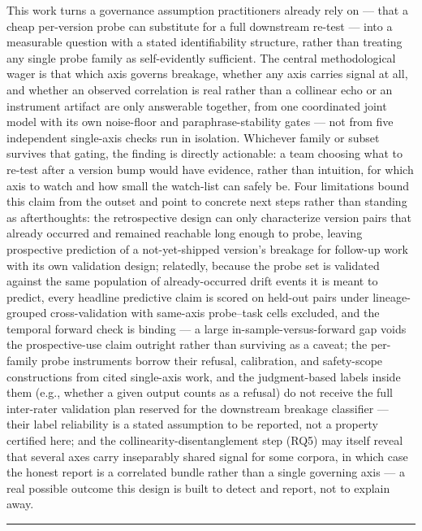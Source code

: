 \documentclass[11pt]{article}
\begin{document}
This work turns a governance assumption practitioners already rely on --- that a cheap per-version probe can substitute for a full downstream re-test --- into a measurable question with a stated identifiability structure, rather than treating any single probe family as self-evidently sufficient. The central methodological wager is that which axis governs breakage, whether any axis carries signal at all, and whether an observed correlation is real rather than a collinear echo or an instrument artifact are only answerable together, from one coordinated joint model with its own noise-floor and paraphrase-stability gates --- not from five independent single-axis checks run in isolation. Whichever family or subset survives that gating, the finding is directly actionable: a team choosing what to re-test after a version bump would have evidence, rather than intuition, for which axis to watch and how small the watch-list can safely be. Four limitations bound this claim from the outset and point to concrete next steps rather than standing as afterthoughts: the retrospective design can only characterize version pairs that already occurred and remained reachable long enough to probe, leaving prospective prediction of a not-yet-shipped version's breakage for follow-up work with its own validation design; relatedly, because the probe set is validated against the same population of already-occurred drift events it is meant to predict, every headline predictive claim is scored on held-out pairs under lineage-grouped cross-validation with same-axis probe--task cells excluded, and the temporal forward check is binding --- a large in-sample-versus-forward gap voids the prospective-use claim outright rather than surviving as a caveat; the per-family probe instruments borrow their refusal, calibration, and safety-scope constructions from cited single-axis work, and the judgment-based labels inside them (e.g., whether a given output counts as a refusal) do not receive the full inter-rater validation plan reserved for the downstream breakage classifier --- their label reliability is a stated assumption to be reported, not a property certified here; and the collinearity-disentanglement step (RQ5) may itself reveal that several axes carry inseparably shared signal for some corpora, in which case the honest report is a correlated bundle rather than a single governing axis --- a real possible outcome this design is built to detect and report, not to explain away.

\vspace{1em}
\hrule
\vspace{1em}
\end{document}
